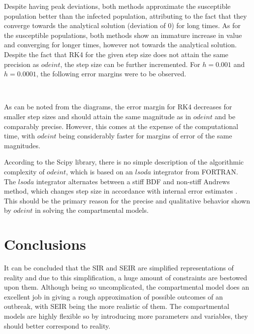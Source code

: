 \documentclass[12pt]{article}
\begin{document}
Despite having peak deviations, both methods approximate the susceptible population better than the infected population, attributing to the fact that they converge towards the analytical solution (deviation of 0) for long times. 
\newpage 
\noindent As for the susceptible populations, both methods show an immature increase in value and converging for longer times, however not towards the analytical solution. Despite the fact that RK4 for the given step size does not attain the same precision as $odeint$, the step size can be further incremented. For $h = 0.001$ and $h = 0.0001$, the following error margins were to be observed.
\begin{figure*}[ht!]
\begin{center}
   \\
   \caption{\label{workflow} (a) RK4 - $h = 0.0001$ (b) RK4 - $h = 0.001$}
\end{center}
\end{figure*}

\noindent As can be noted from the diagrams, the error margin for RK4 decreases for smaller step sizes and should attain the same magnitude as in $odeint$ and be comparably precise. However, this comes at the expense of the computational time, with $odeint$ being considerably faster for margins of error of the same magnitudes. 

According to the Scipy library, there is no simple description of the algorithmic complexity of $odeint$, which is based on an $lsoda$ integrator from FORTRAN. The $lsoda$ integrator alternates between a stiff BDF and non-stiff Andrews method, which changes step size in accordance with internal error estimates \cite{scipy}.  This should be the primary reason for the precise and qualitative behavior shown by $odeint$ in solving the compartmental models. 

\newpage
\section{Conclusions}
It can be concluded that the SIR and SEIR are simplified representations of reality and due to this simplification, a huge amount of constraints are bestowed upon them. Although being so uncomplicated, the compartmental model does an excellent job in giving a rough approximation of possible outcomes of an outbreak, with SEIR being the more realistic of them. The compartmental models are highly flexible so by introducing more parameters and variables, they should better correspond to reality. 
\end{document}

